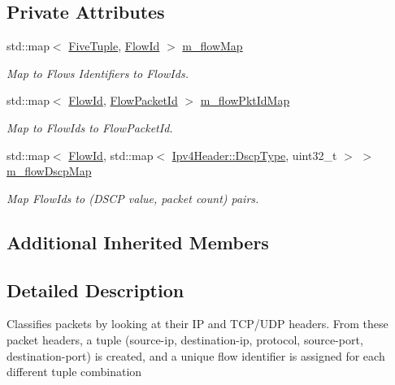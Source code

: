 \subsection*{Private Attributes}
\begin{DoxyCompactItemize}
\item 
std\+::map$<$ \hyperlink{structns3_1_1Ipv4FlowClassifier_1_1FiveTuple}{Five\+Tuple}, \hyperlink{group__flow-monitor_ga39a766c4a370cdb9ab8ac85da4b288e9}{Flow\+Id} $>$ \hyperlink{classns3_1_1Ipv4FlowClassifier_abd62b87d946068783f98976126e131b6}{m\+\_\+flow\+Map}
\begin{DoxyCompactList}\small\item\em Map to Flows Identifiers to Flow\+Ids. \end{DoxyCompactList}\item 
std\+::map$<$ \hyperlink{group__flow-monitor_ga39a766c4a370cdb9ab8ac85da4b288e9}{Flow\+Id}, \hyperlink{group__flow-monitor_gaa1cb18250e1672975204f1254b8aa2ae}{Flow\+Packet\+Id} $>$ \hyperlink{classns3_1_1Ipv4FlowClassifier_a330e21b9b9926ab76ff354aa8ce8e2be}{m\+\_\+flow\+Pkt\+Id\+Map}
\begin{DoxyCompactList}\small\item\em Map to Flow\+Ids to Flow\+Packet\+Id. \end{DoxyCompactList}\item 
std\+::map$<$ \hyperlink{group__flow-monitor_ga39a766c4a370cdb9ab8ac85da4b288e9}{Flow\+Id}, std\+::map$<$ \hyperlink{classns3_1_1Ipv4Header_aaa17802e7732a689311b72d48d1a3450}{Ipv4\+Header\+::\+Dscp\+Type}, uint32\+\_\+t $>$ $>$ \hyperlink{classns3_1_1Ipv4FlowClassifier_ab4fecdf812fb864667d27d028e184784}{m\+\_\+flow\+Dscp\+Map}
\begin{DoxyCompactList}\small\item\em Map Flow\+Ids to (D\+S\+CP value, packet count) pairs. \end{DoxyCompactList}\end{DoxyCompactItemize}
\subsection*{Additional Inherited Members}


\subsection{Detailed Description}
Classifies packets by looking at their IP and T\+C\+P/\+U\+DP headers. From these packet headers, a tuple (source-\/ip, destination-\/ip, protocol, source-\/port, destination-\/port) is created, and a unique flow identifier is assigned for each different tuple combination 

